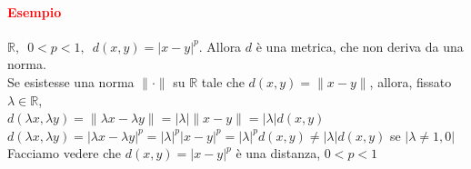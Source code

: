 \documentclass{article}
\newcommand{\R}{\mathbb{R}}
\begin{document}
\paragraph{\textcolor{red}{Esempio}}
$\R, \,\,\, 0 <p<1,\,\,\, d(x,y)=|x-y|^p$. Allora $d$ è una metrica, che non deriva da una norma.\\
Se esistesse una norma $\parallel\cdot\parallel$ su $\R$ tale che $d(x,y)=\parallel x-y\parallel$, allora, fissato $\lambda\in\R$,\\
$d(\lambda x,\lambda y)=\parallel\lambda x-\lambda y\parallel=|\lambda| \parallel x-y\parallel=|\lambda|d(x,y)$\\
$d(\lambda x,\lambda y)=|\lambda x-\lambda y|^p=|\lambda|^p|x-y|^p=|\lambda|^p d(x,y)\neq |\lambda|d(x,y)$ se $|\lambda \neq 1,0|$\\
Facciamo vedere che $d(x,y)=|x-y|^p$ è una distanza, $0<p<1$
\end{document}
